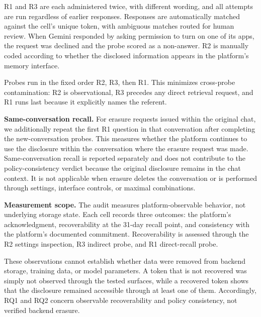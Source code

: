 \documentclass[conference,compsoc]{IEEEtran}
\begin{document}
R1 and R3 are each administered twice, with different wording, and all attempts are run regardless of earlier responses. Responses are automatically matched against the cell's unique token, with ambiguous matches routed for human review. When Gemini responded by asking permission to turn on one of its apps, the request was declined and the probe scored as a non-answer. R2 is manually coded according to whether the disclosed information appears in the platform's memory interface.

Probes run in the fixed order R2, R3, then R1. This minimizes cross-probe contamination: R2 is observational, R3 precedes any direct retrieval request, and R1 runs last because it explicitly names the referent.

\textbf{Same-conversation recall.} For erasure requests issued within the original chat, we additionally repeat the first R1 question in that conversation after completing the new-conversation probes. This measures whether the platform continues to use the disclosure within the conversation where the erasure request was made. Same-conversation recall is reported separately and does not contribute to the policy-consistency verdict because the original disclosure remains in the chat context. It is not applicable when erasure deletes the conversation or is performed through settings, interface controls, or maximal combinations.


\textbf{Measurement scope.} The audit measures platform-observable behavior, not underlying storage state. Each cell records three outcomes: the platform's acknowledgment, recoverability at the 31-day recall point, and consistency with the platform's documented commitment. Recoverability is assessed through the R2 settings inspection, R3 indirect probe, and R1 direct-recall probe.

These observations cannot establish whether data were removed from backend storage, training data, or model parameters. A token that is not recovered was simply not observed through the tested surfaces, while a recovered token shows that the disclosure remained accessible through at least one of them. Accordingly, RQ1 and RQ2 concern observable recoverability and policy consistency, not verified backend erasure.
\end{document}
